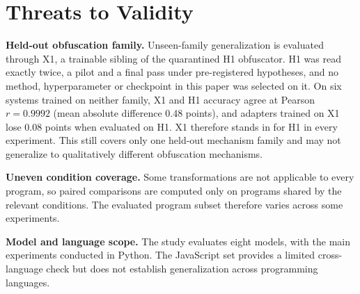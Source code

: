 \section{Threats to Validity}
\label{sec:threats}

\textbf{Held-out obfuscation family.}
Unseen-family generalization is evaluated through X1, a trainable sibling of
the quarantined H1 obfuscator. H1 was read exactly twice, a pilot and a final
pass under pre-registered hypotheses, and no method, hyperparameter or
checkpoint in this paper was selected on it. On six systems trained on neither
family, X1 and H1 accuracy agree at Pearson $r = 0.9992$ (mean absolute
difference 0.48 points), and adapters trained on X1 lose 0.08 points when
evaluated on H1. X1 therefore stands in for H1 in every experiment. This still
covers only one held-out mechanism family and may not generalize to
qualitatively different obfuscation mechanisms.

\textbf{Uneven condition coverage.}
Some transformations are not applicable to every program, so paired comparisons
are computed only on programs shared by the relevant conditions. The evaluated
program subset therefore varies across some experiments.

\textbf{Model and language scope.}
The study evaluates eight models, with the main experiments conducted in Python.
The JavaScript set provides a limited cross-language check but does not establish
generalization across programming languages.
